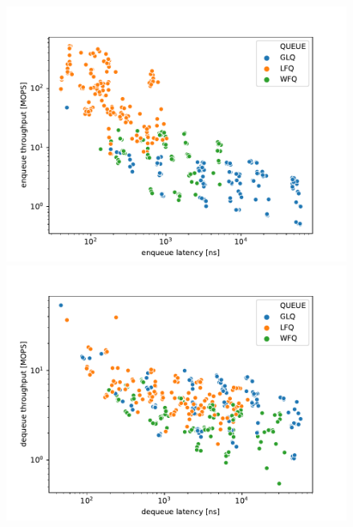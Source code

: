 \documentclass{article}
\begin{document}
\begin{figure}
{\begin{minipage}[b]{0.5\linewidth}
            \includegraphics[width=\linewidth]{../benchmark/SCATTER_LAT_THROUGH_ENQ.pdf}
        \end{minipage}
        \begin{minipage}[b]{0.5\linewidth}
            \centering
            \includegraphics[width=\linewidth]{../benchmark/SCATTER_LAT_THROUGH_DEQ.pdf}
        \end{minipage}
    }
\end{figure}
\clearpage
\end{document}
